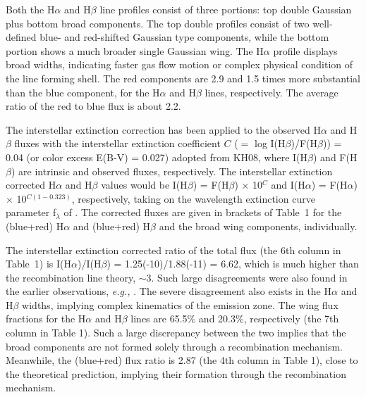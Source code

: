 \documentclass[a4paper,fleqn,usenatbib,useAMS]{mnras}
\def\eg{{\it e.g.,} }
\def\ie{{\it i.e.,} }
\def\ha{H{$\alpha$}}
\def\hb{H{$\beta$}}
\def\heii{He\,{\sc ii}}
\def\niii{N\,{\sc iii}}
\begin{document}
{%

Both the {\ha} and {\hb} line profiles consist of three portions: top double Gaussian plus bottom broad components. The top double profiles consist of two well-defined blue- and red-shifted Gaussian type components, while the bottom portion shows a much broader single Gaussian wing. The {\ha} profile displays broad widths, indicating faster gas flow motion or complex physical condition of the line forming shell.
The red components are 2.9 and 1.5 times more substantial than the blue component, for the {\ha} and {\hb} lines, respectively. The average ratio of the red to blue flux is about 2.2.

The interstellar extinction correction has been applied to the observed {\ha} and {\hb} fluxes with the interstellar extinction coefficient $C$ ($=$ log I({\hb})/F({\hb})) = 0.04 (or color excess E(B-V) = 0.027) adopted from KH08, where I({\hb}) and F({\hb}) are intrinsic and observed fluxes, respectively. The interstellar extinction corrected {\ha} and {\hb} values would be I({\hb}) = F({\hb}) $\times$ 10$^{C}$ and I({\ha}) = F({\ha}) $\times$  10$^{C(1-0.323)}$, respectively, taking on the wavelength extinction curve parameter f$_{\lambda}$ of \citet{sea79}. The corrected fluxes are given in brackets of Table~1 for the (blue+red) {\ha} and (blue+red)  {\hb} and the broad wing components, individually.

The interstellar extinction corrected ratio of the total flux (the 6th column in Table~1) is  I({\ha})/I({\hb}) = 1.25(-10)/1.88(-11) = 6.62, which is much higher than the recombination line theory, $\sim$3. Such large disagreements were also found in the earlier observations, \eg \citet{ken93}. The severe disagreement also exists in the {\ha} and {\hb} widths, implying complex kinematics of the emission zone. The wing flux fractions  for the {\ha}  and {\hb}  lines are 65.5\%  and 20.3\%, respectively (the 7th column in Table 1). Such a large discrepancy between the two implies that the broad components are not formed solely through a recombination mechanism. Meanwhile, the (blue+red) flux ratio is 2.87 (the 4th column in Table 1), close to the theoretical prediction, implying their formation
through the recombination mechanism.

}
\end{document}
